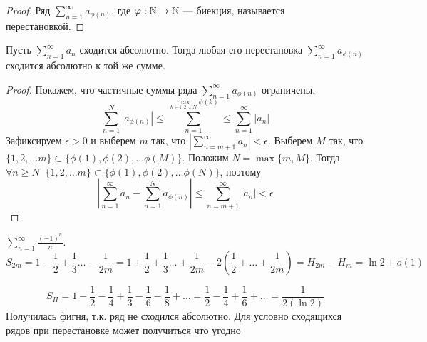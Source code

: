 \begin{proof}
    Ряд \(\sum_{n = 1}^\infty a_{\phi(n)}\), где \(\varphi: \mathbb{N} \rightarrow \mathbb{N}\) --- биекция, называется перестановкой.
\end{proof}
\begin{theorem}
    Пусть \(\sum_{n = 1}^{\infty} a_n\) сходится абсолютно. Тогда любая его перестановка \(\sum_{n = 1}^\infty a_{\phi(n)}\) сходится абсолютно к той же сумме.
\end{theorem}
\begin{proof}
    Покажем, что частичные суммы ряда \(\sum_{n = 1}^\infty a_{\phi(n)}\) ограничены.
    \[\sum_{n = 1}^N|a_{\phi(n)}| \le \sum_{n = 1}^{\max_{k \in {1, 2, \dots N}}\phi(k)} \le \sum_{n = 1}^\infty |a_n|\]
    Зафиксируем \(\epsilon > 0\) и выберем \(m\) так, что \(\left|\sum_{n = m + 1}^\infty a_n\right| < \epsilon\). Выберем \(M\) так, что \(\{1, 2, \dots m\} \subset \{\phi(1), \phi(2), \dots \phi(M)\}\). Положим \(N = \max \{m, M\}\). Тогда \(\forall n \ge N\;\;\{1, 2, \dots m\} \subset \{\phi(1), \phi(2), \dots \phi(N)\}\), поэтому 
    \[\left|\sum_{n = 1}^\infty a_n - \sum_{n = 1}^N a_{\phi(n)}\right| \le \sum_{n = m + 1}^\infty |a_n| < \epsilon\]
\end{proof}
\begin{example}
    \(\sum_{n = 1}^\infty \frac{(-1)^n}{n}\).
    \[S_{2m} = 1 - \frac{1}{2} + \frac{1}{3} \dots - \frac{1}{2m} = 1 + \frac{1}{2} + \frac{1}{3} \dots + \frac{1}{2m} - 2\left(\frac{1}{2} + \dots + \frac{1}{2m}\right) = H_{2m} - H_m = \ln 2 + o(1)\]
\end{example}
\begin{example}
    \[S_\Pi = 1 - \frac{1}{2} - \frac{1}{4} + \frac{1}{3} - \frac{1}{6} - \frac{1}{8} + \dots = \frac{1}{2} - \frac{1}{4} + \frac{1}{6} + \dots = \frac{1}{2\left(\ln 2\right)}\]
    Получилась фигня, т.к. ряд не сходился абсолютно. Для условно сходящихся рядов при перестановке может получиться что угодно
\end{example}

